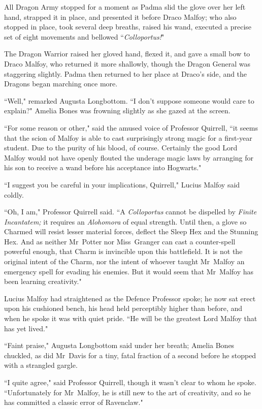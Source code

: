 All Dragon Army stopped for a moment as Padma slid the glove over her left hand, strapped it in place, and presented it before Draco Malfoy; who also stopped in place, took several deep breaths, raised his wand, executed a precise set of eight movements and bellowed ``\emph{Colloportus!}"

The Dragon Warrior raised her gloved hand, flexed it, and gave a small bow to Draco Malfoy, who returned it more shallowly, though the Dragon General was staggering slightly. Padma then returned to her place at Draco's side, and the Dragons began marching once more.

``Well," remarked Augusta Longbottom. ``I don't suppose someone would care to explain?" Amelia Bones was frowning slightly as she gazed at the screen.

``For some reason or other," said the amused voice of Professor Quirrell, ``it seems that the scion of Malfoy is able to cast surprisingly strong magic for a first-year student. Due to the purity of his blood, of course. Certainly the good Lord Malfoy would not have openly flouted the underage magic laws by arranging for his son to receive a wand before his acceptance into Hogwarts."

``I suggest you be careful in your implications, Quirrell," Lucius Malfoy said coldly.

``Oh, I am," Professor Quirrell said. ``A \emph{Colloportus} cannot be dispelled by \emph{Finite Incantatem;} it requires an \emph{Alohomora} of equal strength. Until then, a glove so Charmed will resist lesser material forces, deflect the Sleep Hex and the Stunning Hex. And as neither Mr~Potter nor Miss~Granger can cast a counter-spell powerful enough, that Charm is invincible upon this battlefield. It is not the original intent of the Charm, nor the intent of whoever taught Mr~Malfoy an emergency spell for evading his enemies. But it would seem that Mr~Malfoy has been learning creativity."

Lucius Malfoy had straightened as the Defence Professor spoke; he now sat erect upon his cushioned bench, his head held perceptibly higher than before, and when he spoke it was with quiet pride. ``He will be the greatest Lord Malfoy that has yet lived."

``Faint praise," Augusta Longbottom said under her breath; Amelia Bones chuckled, as did Mr~Davis for a tiny, fatal fraction of a second before he stopped with a strangled gargle.

``I quite agree," said Professor Quirrell, though it wasn't clear to whom he spoke. ``Unfortunately for Mr~Malfoy, he is still new to the art of creativity, and so he has committed a classic error of Ravenclaw."

